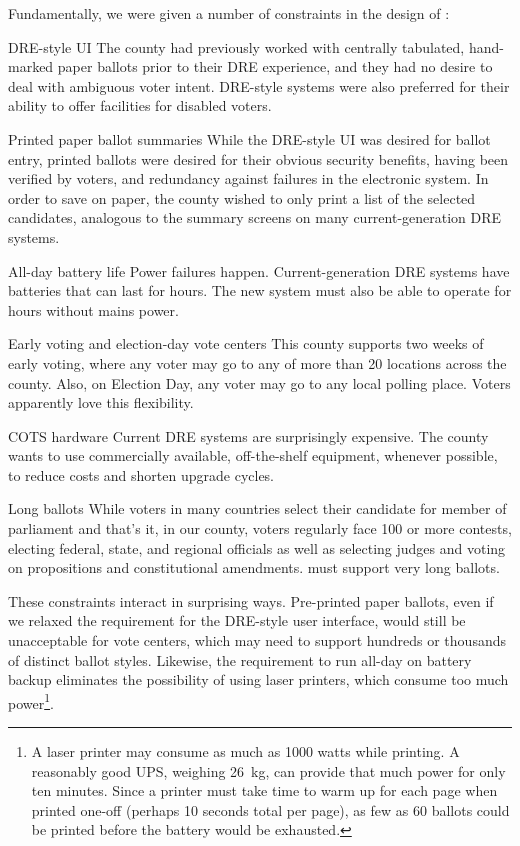 Fundamentally, we were given a number of constraints in the design of \projname:
\begin{compactdesc}
\item[DRE-style UI] 
The county had previously worked with centrally tabulated,
    hand-marked paper ballots prior to their DRE experience, and they
    had no desire to deal with ambiguous voter intent. DRE-style
    systems were also preferred for their ability to offer facilities for
    disabled voters.

\item[Printed paper ballot summaries]
    While the DRE-style UI was
    desired for ballot entry, printed ballots were desired for their
    obvious security benefits, having been verified by voters, and redundancy against failures in the
    electronic system. In order to save on paper, the county wished to
    only print a list of the selected candidates, analogous to the
    summary screens on many current-generation DRE systems.

\item[All-day battery life]
    Power failures happen. Current-generation DRE systems have
    batteries that can last for hours. The new system must also be
    able to operate for hours without mains power.

\item[Early voting and election-day vote centers]
    This county supports two weeks of early voting, where any voter
    may go to any of more than 20 locations across the county. Also,
    on Election Day, any voter may go to any local polling
    place. Voters apparently love this flexibility.

\item[COTS hardware]
    Current DRE systems are surprisingly expensive. The county wants
    to use commercially available, off-the-shelf equipment, whenever
    possible, to reduce costs and shorten upgrade cycles.

\item[Long ballots]
    While voters in many countries select their candidate for member
    of parliament and that's it, in our county, voters regularly face
    100 or more contests, electing federal, state, and regional
    officials as well as selecting judges and voting on propositions
    and constitutional amendments. \projname must support very long
    ballots.
\end{compactdesc}

These constraints interact in surprising ways. Pre-printed paper
ballots, even if we relaxed the requirement for the DRE-style user
interface, would still be unacceptable for vote centers, which may
need to support hundreds or thousands of distinct ballot
styles. Likewise, the requirement to run all-day on battery backup
eliminates the possibility of using laser printers, which consume too
much power\footnote{A laser printer may consume as much as 1000 watts
  while printing. A reasonably good UPS, weighing 26~kg, can provide
  that much power for only ten minutes. Since a printer must take time
  to warm up for each page when printed one-off (perhaps 10
  seconds total per page), as few as 60 ballots could be printed before the
  battery would be exhausted.}.


